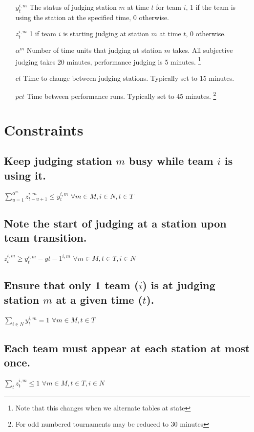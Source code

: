 \documentclass[letterpaper,11pt]{report}
\newcommand{\doccomment}[3]%
{\marginpar{\textcolor{#2}{\bf #1}}%
\footnote{{\color{#2}#3}}%
}
\newcommand{\doccomment}[3]{}
\newcommand{\jpscomment}[1]%
{\doccomment{SCHEWE}{Bittersweet}{#1}}
\begin{document}
\begin{itemize}
\item[$y_{t}^{i,m}$] The status of judging station $m$ at time $t$ for team
  $i$, 1 if the team is using the station at the specified time, 0 otherwise.

\item[$z_{t}^{i,m}$] 1 if team $i$ is starting judging at station $m$ at
  time $t$, 0 otherwise.
 
\item[$\alpha^{m}$] Number of time units that judging at station $m$
  takes. All subjective judging takes 20 minutes, performance judging is 5
  minutes. \jpscomment{Note that this changes when we alternate tables at state}

\item[$ct$] Time to change between judging stations. Typically set to 15
  minutes.
\item[$pct$] Time between performance runs. Typically set to 45
  minutes. \jpscomment{For odd numbered tournaments may be reduced to 30
    minutes}


\end{itemize}

\section{Constraints}

\subsection{Keep judging station $m$ busy while team $i$ is using it.}
$\sum\limits_{u=1}^{\alpha^{m}} z_{t-u+1}^{i,m} \le y_{t}^{i,m}$
\hfill $\forall m \in M, i \in N, t \in T$

\subsection{Note the start of judging at a station upon team transition.}
$z_{t}^{i,m} \ge y_{t}^{i,m} - y{t-1}^{i,m}$
\hfill $\forall m \in M, t \in T, i \in N$

\subsection{Ensure that only 1 team ($i$) is at judging station $m$ at a given time
($t$).}
$\sum\limits_{i \in N} y_{t}^{i,m} = 1$          
\hfill $\forall m \in M, t \in T$

\subsection{Each team must appear at each station at most once.}
$\sum\limits_{t} z_{t}^{i,m} \le 1$
\hfill $\forall m \in M, t \in T, i \in N$
\end{document}
